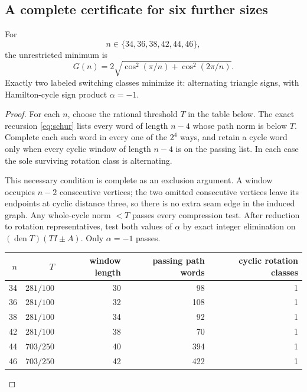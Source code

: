 \subsection{A complete certificate for six further sizes}

\begin{theorem}
\label{th:six}
For
\[
n\in\{34,36,38,42,44,46\},
\]
the unrestricted minimum is
\begin{equation}
G(n)=2\sqrt{\cos^2(\pi/n)+\cos^2(2\pi/n)}.
\label{eq:alternating}
\end{equation}
Exactly two labeled switching classes minimize it: alternating triangle
signs, with Hamilton-cycle sign product \(\alpha=-1\).
\end{theorem}

\begin{proof}
For each \(n\), choose the rational threshold \(T\) in the table below.
The exact recursion \eqref{eq:schur} lists every word of length \(n-4\)
whose path norm is below \(T\). Complete each such word in every one of
the \(2^4\) ways, and retain a cycle word only when every cyclic window
of length \(n-4\) is on the passing list. In each case the sole surviving
rotation class is alternating.

This necessary condition is complete as an exclusion argument. A window
occupies \(n-2\) consecutive vertices; the two omitted consecutive vertices
leave its endpoints at cyclic distance three, so there is no extra seam
edge in the induced graph. Any whole-cycle norm \(<T\) passes every
compression test. After reduction to rotation representatives, test both
values of \(\alpha\) by exact integer elimination on
\((\operatorname{den}T)(TI\pm A)\). Only \(\alpha=-1\) passes.

\begin{center}
\begin{tabular}{rrrrr}
\toprule
\(n\)&\(T\)&window length&passing path words&cyclic rotation classes\\
\midrule
34&\(281/100\)&30&98&1\\
36&\(281/100\)&32&108&1\\
38&\(281/100\)&34&92&1\\
42&\(281/100\)&38&70&1\\
44&\(703/250\)&40&394&1\\
46&\(703/250\)&42&422&1\\
\bottomrule
\end{tabular}
\end{center}


\end{proof}
